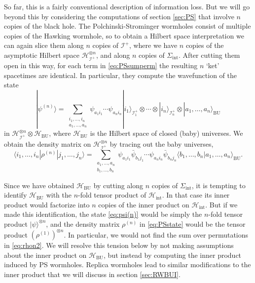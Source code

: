 \documentclass[letterpaper,12pt]{article}
\newcommand*{\hilb}{\mathcal{H}}	%
\newcommand*{\hbu}{\mathcal{H}_\text{BU}} %
\newcommand*{\scri}{\mathscr{I}} %
\begin{document}
So far, this is a fairly conventional description of information loss. But we will go beyond this by considering the computations of section \ref{sec:PS} that involve $n$ copies of the black hole. The Polchinski-Strominger wormholes consist of multiple copies of the Hawking wormhole, so to obtain a Hilbert space interpretation we can again slice them along $n$ copies of $\scri^+$, where we have $n$ copies of the asymptotic Hilbert space $\hilb_{\scri^+}^{\otimes n}$, and along $n$ copies of $\Sigma_\mathrm{int}$. After cutting them open in this way, for each term in \eqref{eq:PSsumperm} the resulting $n$ `ket' spacetimes are identical.  In particular, they compute the wavefunction of the state
\begin{equation}
\label{eq:psi(n)}
	|\psi^{(n)}\rangle  = \sum_{\substack{{i_1,\ldots,i_n}\\{a_1,\ldots,a_n}}} \psi_{a_1 i_1}\cdots \psi_{a_n i_n}  |i_1\rangle_{\scri^+_1} \otimes\cdots \otimes |i_n\rangle_{\scri^+_n} \otimes |a_1,\ldots,a_n \rangle_{\mathrm{BU}}
\end{equation}
in $\hilb_{\scri^+}^{\otimes n} \otimes \hbu$, where $\hbu$ is the Hilbert space of closed (baby) universes. We obtain the density matrix on  $\hilb_{\scri^+}^{\otimes n}$ by tracing out the baby universes,
\begin{equation}\label{eq:PSstate}
	\langle i_1,\ldots,i_n|\rho^{(n)}|j_1,\ldots,j_n\rangle = \sum_{\substack{{a_1,\ldots,a_n}\\{b_1,\ldots,b_n}}} \psi_{a_1 i_1}\bar{\psi}_{b_1 j_1}\cdots \psi_{a_n i_n}\bar{\psi}_{b_n j_n} \langle b_1,\ldots,b_n|a_1,\ldots,a_n \rangle_{\mathrm{BU}}.
\end{equation}

Since we have obtained $\hbu$ by cutting along $n$ copies of $\Sigma_\mathrm{int}$, it is tempting to identify $\hbu$  with the $n$-fold tensor product of $\hilb_\mathrm{int}$.  In that case its inner product would factorize into $n$ copies of the inner product on $\hilb_\mathrm{int}$. But if we made this identification, the state \eqref{eq:psi(n)} would be simply the $n$-fold tensor product $|\psi\rangle^{\otimes n}$, and the density matrix $\rho^{(n)}$ in \eqref{eq:PSstate} would be the tensor product $\left(\rho^{(1)}\right)^{\otimes n}$.  In particular, we would not find the sum over permutations in \eqref{eq:rhon2}.  We will resolve this tension below by not making assumptions about the inner product on  $\hbu$, but instead by computing the inner product induced by PS wormholes.  Replica wormholes lead to similar modifications to the inner product that we will discuss in section \ref{sec:RWBUI}.
\end{document}
